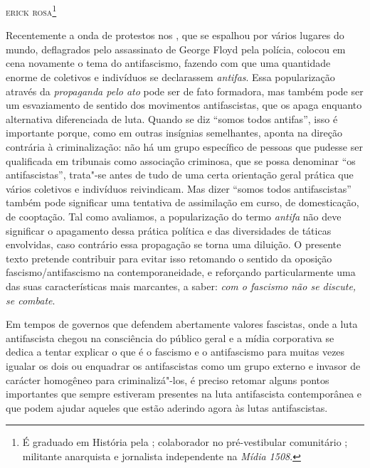 \hfill{}\textsc{erick rosa}\footnote{É graduado em História pela ; colaborador no
  pré-vestibular comunitário ; militante anarquista e jornalista independente na \emph{Mídia 1508}.}

\bigskip

Recentemente a onda de protestos nos , que se espalhou por vários
lugares do mundo, deflagrados pelo assassinato de George Floyd pela
polícia, colocou em cena novamente o tema do antifascismo, fazendo com
que uma quantidade enorme de coletivos e indivíduos se declarassem
\emph{antifas}. Essa popularização através da \emph{propaganda pelo ato}
pode ser de fato formadora, mas também pode ser um esvaziamento de
sentido dos movimentos antifascistas, que os apaga enquanto alternativa
diferenciada de luta. Quando se diz ``somos todos antifas'', isso é
importante porque, como em outras insígnias semelhantes, aponta na
direção contrária à criminalização: não há um grupo específico de
pessoas que pudesse ser qualificada em tribunais como associação
criminosa, que se possa denominar ``os antifascistas'', trata"-se antes de
tudo de uma certa orientação geral prática que vários coletivos e
indivíduos reivindicam. Mas dizer ``somos todos antifascistas'' também
pode significar uma tentativa de assimilação em curso, de domesticação,
de cooptação. Tal como avaliamos, a popularização do termo \emph{antifa}
não deve significar o apagamento dessa prática política e das
diversidades de táticas envolvidas, caso contrário essa propagação se
torna uma diluição. O presente texto pretende contribuir para evitar
isso retomando o sentido da oposição fascismo/antifascismo na
contemporaneidade, e reforçando particularmente uma das suas
características mais marcantes, a saber: \emph{com o fascismo não se
discute, se combate}.

Em tempos de governos que defendem abertamente valores fascistas, onde a
luta antifascista chegou na consciência do público geral e a mídia
corporativa se dedica a tentar explicar o que é o fascismo e o
antifascismo para muitas vezes igualar os dois ou enquadrar os
antifascistas como um grupo externo e invasor de carácter homogêneo para
criminalizá"-los, é preciso retomar alguns pontos importantes que sempre
estiveram presentes na luta antifascista contemporânea e que podem
ajudar aqueles que estão aderindo agora às lutas antifascistas.

